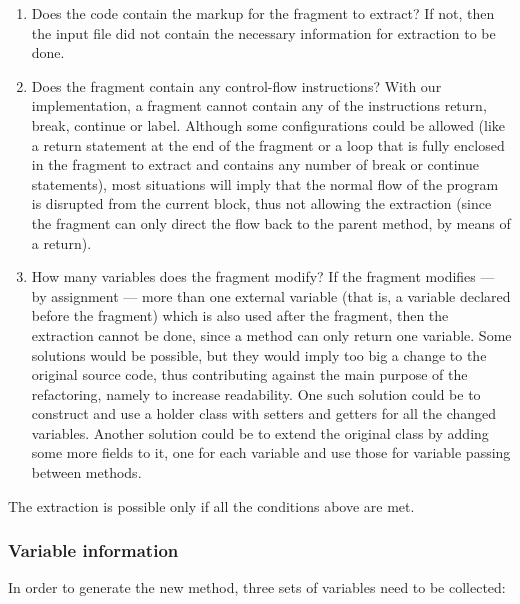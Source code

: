 \documentclass[a4paper,10pt]{article}
\begin{document}
\begin{enumerate}

\item Does the code contain the markup for the fragment to extract?
If not, then the input file did not contain the necessary
information for extraction to be done.

\item Does the fragment contain any control-flow instructions? With
our implementation, a fragment cannot contain any of the
instructions \textsf{return}, \textsf{break}, \textsf{continue} or
\textsf{label}. Although some configurations could be allowed (like
a \textsf{return} statement at the end of the fragment or a
loop that is fully enclosed in the fragment to extract and contains
any number of \textsf{break} or \textsf{continue}
statements), most situations will imply that the normal flow of the
program is disrupted from the current block, thus not allowing the
extraction (since the fragment can only direct the flow back to the
parent method, by means of a \textsf{return}).

\item How many variables does the fragment modify? If the fragment
modifies --- by assignment --- more than one external variable (that
is, a variable declared before the fragment) which is also used
after the fragment, then the extraction cannot be done, since a
method can only return one variable. Some solutions would be
possible, but they would imply too big a change to the original
source code, thus contributing against the main purpose of the
refactoring, namely to increase readability. One such solution could
be to construct and use a holder class with setters and getters for
all the changed variables. Another solution could be to extend the
original class by adding some more fields to it, one for each
variable and use those for variable passing between methods.

\end{enumerate}

The extraction is possible only if all the conditions above are met.

\subsubsection{Variable information}
\label{vars}
In order to generate the new method, three sets of variables need to
be collected:
\end{document}
